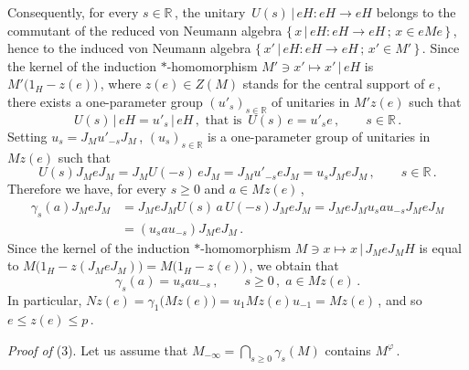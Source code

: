 \documentclass[reqno]{amsart}
\theoremstyle{definition}
\theoremstyle{remark}
\numberwithin{equation}{section}
\theoremstyle{plain}
\begin{document}
Consequently, for every $s\in\mathbb R\,$, the unitary
$\, U(s)\, |\, eH : eH\rightarrow eH$ belongs to the commutant
of the reduced von Neumann algebra $\big\{\, x\, |\, eH : eH
\rightarrow eH\, ;\, x\in eMe\,\big\}\,$, hence to the induced
von Neumann algebra $\big\{\, x'\, |\, eH : eH\rightarrow
eH\, ;\, x'\in M'\,\big\}\,$. Since the kernel of the induction
$*$-homomorphism $M'\ni x'\mapsto x'\, |\, eH$ is
$M' \big( 1_H -z(e)\big)\,$, where $z(e)\in Z(M)$ stands for the
central support of $e\,$, there exists a
one-parameter group $(u'_{\! s} )_{s\in\mathbb R}$ of unitaries
in $M'z(e)$ such that
\begin{equation*}
U(s)\, |\, eH =u'_{\! s}\, |\, eH\, ,\text{ that is }\,
U(s)\, e =u'_{\! s} e\, ,\qquad s\in\mathbb R\, .
\end{equation*}
Setting $u_s =J_M u'_{-s} J_M\,$, $(u_s )_{s\in\mathbb R}$ is a
one-parameter group of unitaries in $M z(e)$ such that
\begin{equation*}%
U(s) J_M e J_M =J_M U(-s)\, e J_M =J_M u'_{-s} e J_M =u_s
J_M e J_M\, ,\qquad s\in\mathbb R\, .
\end{equation*}
Therefore we have, for every $s\geq 0$ and $a\in M z(e)\,$,
\begin{align*}
\gamma_s (a) J_M e J_M &=J_M e J_M U(s)\, a\, U(-s) J_M e J_M =
J_M e J_M u_s a u_{-s} J_M e J_M \\
&= (u_s a u_{-s}) J_M e J_M\, .
\end{align*}
Since the kernel of the induction $*$-homomorphism $M\ni x\mapsto
x\, |\, J_M e J_M H$ is equal to $M\big( 1_H -z(J_M e J_M)\big)
=M\big( 1_H -z(e)\big)\,$, we obtain that
\begin{equation*}
\gamma_s (a) =u_s a u_{-s}\, ,\qquad s\geq 0\, ,\; a\in Mz(e)\, .
\end{equation*}
In particular, $Nz(e)=\gamma_1\big( M z(e)\big) =u_1 Mz(e) u_{-1}
=Mz(e)\,$, and so $e\leq z(e)\leq p\,$.
\medskip

{\it Proof of }(3).
Let us assume that $\displaystyle M_{-\infty} =
\bigcap\limits_{s\geq 0} \gamma_s (M)$ contains $M^\varphi\,$.
\end{document}

